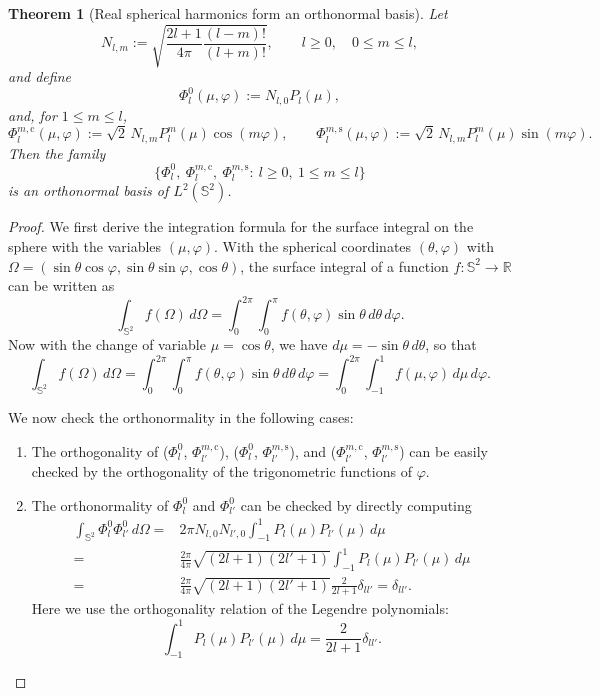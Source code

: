 \documentclass[11pt]{article}
\numberwithin{equation}{section}
\newtheorem{thm}{Theorem}[section]
\begin{document}
\begin{thm}[Real spherical harmonics form an orthonormal basis]\label{thm:real-sph-harm-orthonormal}
Let
\[
N_{l,m}:=\sqrt{\frac{2l+1}{4\pi}\frac{(l-m)!}{(l+m)!}},
\qquad l\ge 0,\quad 0\le m\le l,
\]
and define
\[
\Phi_l^0(\mu,\varphi):=N_{l,0}P_l(\mu),
\]
and, for \(1\le m\le l\),
\[
\Phi_l^{m,\mathrm c}(\mu,\varphi)
:=\sqrt{2}\,N_{l,m}P_l^m(\mu)\cos(m\varphi),
\qquad
\Phi_l^{m,\mathrm s}(\mu,\varphi)
:=\sqrt{2}\,N_{l,m}P_l^m(\mu)\sin(m\varphi).
\]
Then the family
\[
\bigl\{\Phi_l^0,\ \Phi_l^{m,\mathrm c},\ \Phi_l^{m,\mathrm s}
:\ l\ge 0,\ 1\le m\le l\bigr\}
\]
is an orthonormal basis of \(L^2(\mathbb S^2)\).
\end{thm}
\begin{proof}
    We first derive the integration formula for the surface integral on the sphere with the variables \((\mu,\varphi)\). With the spherical coordinates \((\theta,\varphi)\) with $\Omega = (\sin\theta\cos\varphi,\sin\theta\sin\varphi,\cos\theta)$, the surface integral of a function \(f:\mathbb S^2\to\mathbb R\) can be written as
    \begin{equation}
    \int_{\mathbb S^2} f(\Omega)\,d\Omega = \int_0^{2\pi}\int_0^\pi f(\theta,\varphi)\sin\theta\,d\theta\,d\varphi.
    \end{equation}
    Now with the change of variable $\mu=\cos\theta$, we have $d\mu=-\sin\theta\,d\theta$, so that
    \[
    \int_{\mathbb S^2} f(\Omega)\,d\Omega
    =
    \int_0^{2\pi}\int_0^\pi f(\theta,\varphi)\sin\theta\,d\theta\,d\varphi
    =
    \int_0^{2\pi}\int_{-1}^1 f(\mu,\varphi)\,d\mu\,d\varphi.
    \]

    We now check the orthonormality in the following cases: 
    \begin{enumerate}

    \item 
    The orthogonality of (\(\Phi_l^0\), \(\Phi_{l'}^{m,\mathrm c}\)), (\(\Phi_l^0\), \(\Phi_{l'}^{m,\mathrm s}\)), and (\(\Phi_{l'}^{m,\mathrm c}\), \(\Phi_{l'}^{m,\mathrm s}\)) can be easily checked by the orthogonality of the trigonometric functions of \(\varphi\).

    \item 
    The orthonormality of $\Phi_l^0$ and $\Phi_{l'}^0$ can be checked by directly computing
    \begin{equation}
    \begin{aligned}
        \int_{\mathbb S^2}\Phi_l^0\Phi_{l'}^0\,d\Omega ={}&
        2\pi N_{l,0}N_{l',0}\int_{-1}^1 P_l(\mu)P_{l'}(\mu)\,d\mu \\
        ={}& \frac{2\pi}{4\pi}\sqrt{(2l+1)(2l'+1)}\int_{-1}^1 P_l(\mu)P_{l'}(\mu)\,d\mu \\
        ={}& \frac{2\pi}{4\pi}\sqrt{(2l+1)(2l'+1)} \frac{2}{2l+1} \delta_{ll'} = \delta_{ll'}.
    \end{aligned}
    \end{equation}
    Here we use the orthogonality relation of the Legendre polynomials:
    \begin{equation}
        \int_{-1}^1 P_l(\mu)P_{l'}(\mu)\,d\mu = \frac{2}{2l+1}\delta_{ll'}.
    \end{equation}


\end{enumerate}
\end{proof}
\end{document}
